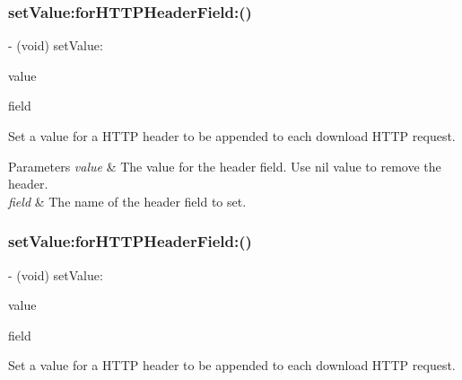 \subsubsection{\texorpdfstring{set\+Value\+:for\+H\+T\+T\+P\+Header\+Field\+:()}{setValue:forHTTPHeaderField:()}\hspace{0.1cm}{\footnotesize\ttfamily [2/3]}}
{\footnotesize\ttfamily -\/ (void) set\+Value\+: \begin{DoxyParamCaption}\item[{(N\+S\+String $\ast$)}]{value }\item[{forHTTPHeaderField:(N\+S\+String $\ast$)}]{field }\end{DoxyParamCaption}}

Set a value for a H\+T\+TP header to be appended to each download H\+T\+TP request.


\begin{DoxyParams}{Parameters}
{\em value} & The value for the header field. Use {\ttfamily nil} value to remove the header. \\
\hline
{\em field} & The name of the header field to set. \\
\hline
\end{DoxyParams}
\mbox{\label{interface_s_d_web_image_downloader_a119389f3da3de86ef65fd86f76169acb}} 
\subsubsection{\texorpdfstring{set\+Value\+:for\+H\+T\+T\+P\+Header\+Field\+:()}{setValue:forHTTPHeaderField:()}\hspace{0.1cm}{\footnotesize\ttfamily [3/3]}}
{\footnotesize\ttfamily -\/ (void) set\+Value\+: \begin{DoxyParamCaption}\item[{(N\+S\+String $\ast$)}]{value }\item[{forHTTPHeaderField:(N\+S\+String $\ast$)}]{field }\end{DoxyParamCaption}}

Set a value for a H\+T\+TP header to be appended to each download H\+T\+TP request.


